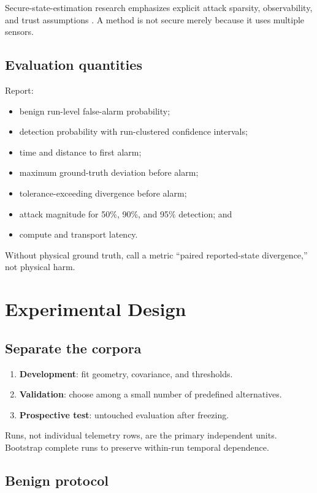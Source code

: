 \documentclass[11pt,oneside]{book}
\begin{document}
Secure-state-estimation research emphasizes explicit attack sparsity,
observability, and trust assumptions \cite{pasqualetti2013,fawzi2014}. A method
is not secure merely because it uses multiple sensors.

\section{Evaluation quantities}

Report:
\begin{itemize}
  \item benign run-level false-alarm probability;
  \item detection probability with run-clustered confidence intervals;
  \item time and distance to first alarm;
  \item maximum ground-truth deviation before alarm;
  \item tolerance-exceeding divergence before alarm;
  \item attack magnitude for 50\%, 90\%, and 95\% detection; and
  \item compute and transport latency.
\end{itemize}

Without physical ground truth, call a metric ``paired reported-state
divergence,'' not physical harm.

\chapter{Experimental Design}

\section{Separate the corpora}

\begin{enumerate}
  \item \textbf{Development}: fit geometry, covariance, and thresholds.
  \item \textbf{Validation}: choose among a small number of predefined
  alternatives.
  \item \textbf{Prospective test}: untouched evaluation after freezing.
\end{enumerate}

Runs, not individual telemetry rows, are the primary independent units.
Bootstrap complete runs to preserve within-run temporal dependence.

\section{Benign protocol}
\end{document}
